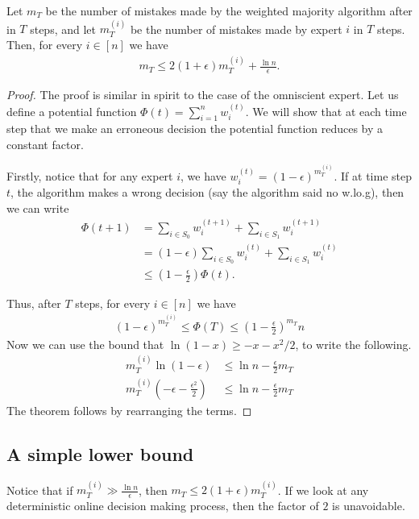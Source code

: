 \begin{theorem}
	Let $m_T$ be the number of mistakes made by the weighted majority algorithm after in $T$ steps, and let $m^{(i)}_T$ be the number of mistakes made by expert $i$ in $T$ steps. Then, for every $i \in [n]$ we have
	\begin{align*}
		m_T \leq 2(1+\epsilon)m^{(i)}_T + \frac{\ln n}{\epsilon}.
	\end{align*}
	\label{thm:wgtd-maj}
\end{theorem}
\begin{proof}
	The proof is similar in spirit to the case of the omniscient expert. Let us define a potential function $\Phi(t) = \sum_{i=1}^n w_i^{(t)}$. We will show that at each time step that we make an erroneous decision the potential function reduces by a constant factor.
	
	Firstly, notice that for any expert $i$, we have $w_i^{(t)} = (1-\epsilon)^{m_T^{(i)}}$. If at time step $t$, the algorithm makes a wrong decision (say the algorithm said no w.lo.g), then we can write
	\begin{align*}
		\Phi(t+1) &= \sum_{i\in S_0} w_i^{(t+1)} + \sum_{i\in S_1} w_i^{(t+1)}\\
		&= (1-\epsilon)\sum_{i\in S_0} w_i^{(t)} + \sum_{i\in S_1} w_i^{(t)}\\
		&\leq \left( 1 - \frac{\epsilon}{2}\right)\Phi(t).
	\end{align*}

	Thus, after $T$ steps, for every $i\in [n]$ we have
	\begin{align*}
          (1-\epsilon)^{m_{T}^{(i)}} \leq \Phi(T) \leq \left(1 - \frac{\epsilon}{2} \right)^{m_T}n
	\end{align*}
	Now we can use the bound that $\ln(1-x) \geq -x - x^2/2$, to write the
        following.
        \begin{align*}
          m_T^{(i)}\ln (1 - \epsilon) &\leq \ln n - \frac{\epsilon}{2}m_T\\
          m_T^{(i)} \left( -\epsilon - \frac{\epsilon^2}{2} \right) &\leq \ln n - \frac{\epsilon}{2} m_T
        \end{align*}
        The theorem follows by rearranging the terms.
      \end{proof}

\subsection{A simple lower bound}

Notice that if $m_T^{(i)} \gg \frac{\ln n}{\epsilon}$, then
$m_T \leq 2(1+\epsilon) m_T^{(i)}$. If we look at any deterministic online
decision making process, then the factor of $2$ is unavoidable.

